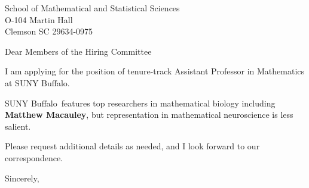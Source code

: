 




	
	
	\def\School{SUNY Buffalo}
	
	\begin{letter}
		{School of Mathematical and Statistical Sciences\\
			O-104 Martin Hall\\
			Clemson SC 29634-0975
		}
		
		\opening{Dear Members of the Hiring Committee}
		
		
		I am applying for the position of tenure-track Assistant Professor in Mathematics at \School. 
		
		\School~features top researchers in mathematical biology including \textbf{Matthew Macauley}, but representation in mathematical neuroscience is less salient. 
		
		
		
		
		
		Please request additional details as needed, and I look forward to our correspondence.
		
		\closing{Sincerely,}
	\end{letter}
